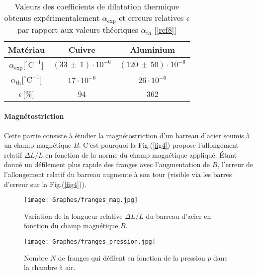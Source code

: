 \documentclass[a4paper, 12pt,oneside]{article}
\begin{document}
\begin{table}[h]
    \centering
    \begin{tabular}{|c||c|c|}
        \hline
        Matériau & Cuivre & Aluminium\\
        \hline        $\alpha_{\text{exp}}[^\circ\text{C}^{-1}$] & $(33\,\pm\,1)\cdot10^{-6}$ & $(120\,\pm\,50)\cdot10^{-6}$  \\
        \hline        $\alpha_{\text{th}}[^\circ\text{C}^{-1}$]  & $17\cdot10^{-6}$ & $26\cdot10^{-6}$\\
        \hline
        $\epsilon\,$[\%] & 94 & 362\\
        \hline
    \end{tabular}
    \captionsetup{justification=centering}
    \caption{Valeurs des coefficients de dilatation thermique obtenus expérimentalement $\alpha_{\text{exp}}$ et erreurs relatives $\epsilon$ par rapport aux valeurs théoriques $\alpha_{\text{th}}$ [\ref{ref8}]}
    \label{tab2}
\end{table}
\vspace{-0.2cm}
\paragraph{Magnétostriction}
Cette partie consiste à étudier la magnétostriction d’un barreau d’acier soumis à un champ magnétique $B$. C'est pourquoi la Fig.(\ref{fig4}) propose l’allongement relatif $\Delta L/L$ en fonction de la norme du champ magnétique appliqué. Étant donné un défilement plus rapide des franges avec l'augmentation de $B$, l'erreur de l'allongement relatif du barreau augmente à son tour (visible via les barres d'erreur sur la Fig.(\ref{fig4})).

\begin{figure}[H]
    \centering
    \begin{minipage}{0.45\textwidth}
        \centering
        \texttt{[image: Graphes/franges\_mag.jpg]}
        \captionsetup{justification=centering}
        \caption{Variation de la longueur relative $\Delta L/L$ du barreau d'acier en fonction du champ magnétique $B$.}
        \label{fig4}
    \end{minipage}
    \hfill
    \begin{minipage}{0.45\textwidth}
        \centering
        \texttt{[image: Graphes/franges\_pression.jpg]}
        \captionsetup{justification=centering}
        \caption{Nombre $N$ de franges qui défilent en fonction de la pression $p$ dans la chambre à air.}
        \label{fig5}
    \end{minipage}
\end{figure}
\vspace{-0.8cm}
\end{document}
